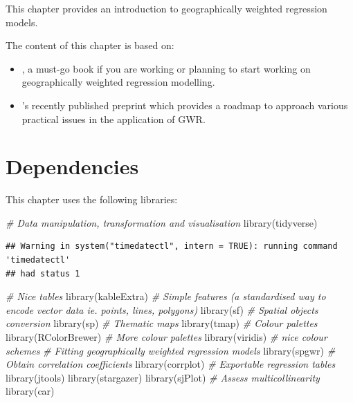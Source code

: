 \documentclass[
]{book}
\newenvironment{Shaded}{\begin{snugshade}}{\end{snugshade}}
\newcommand{\CommentTok}[1]{\textcolor[rgb]{0.56,0.35,0.01}{\textit{#1}}}
\newcommand{\FunctionTok}[1]{\textcolor[rgb]{0.00,0.00,0.00}{#1}}
\newcommand{\NormalTok}[1]{#1}
\begin{document}
This chapter provides an introduction to geographically weighted regression models.

The content of this chapter is based on:

\begin{itemize}
\item
  \citet{Fotheringham_et_al_2002_book}, a must-go book if you are working or planning to start working on geographically weighted regression modelling.
\item
  \citet{comber2020gwr}'s recently published preprint which provides a roadmap to approach various practical issues in the application of GWR.
\end{itemize}

\hypertarget{dependencies-6}{%
\section{Dependencies}\label{dependencies-6}}

This chapter uses the following libraries:

\begin{Shaded}
\begin{Highlighting}[]
\CommentTok{\# Data manipulation, transformation and visualisation}
\FunctionTok{library}\NormalTok{(tidyverse)}
\end{Highlighting}
\end{Shaded}

\begin{verbatim}
## Warning in system("timedatectl", intern = TRUE): running command 'timedatectl'
## had status 1
\end{verbatim}

\begin{Shaded}
\begin{Highlighting}[]
\CommentTok{\# Nice tables}
\FunctionTok{library}\NormalTok{(kableExtra)}
\CommentTok{\# Simple features (a standardised way to encode vector data ie. points, lines, polygons)}
\FunctionTok{library}\NormalTok{(sf) }
\CommentTok{\# Spatial objects conversion}
\FunctionTok{library}\NormalTok{(sp) }
\CommentTok{\# Thematic maps}
\FunctionTok{library}\NormalTok{(tmap) }
\CommentTok{\# Colour palettes}
\FunctionTok{library}\NormalTok{(RColorBrewer) }
\CommentTok{\# More colour palettes}
\FunctionTok{library}\NormalTok{(viridis) }\CommentTok{\# nice colour schemes}
\CommentTok{\# Fitting geographically weighted regression models}
\FunctionTok{library}\NormalTok{(spgwr)}
\CommentTok{\# Obtain correlation coefficients}
\FunctionTok{library}\NormalTok{(corrplot)}
\CommentTok{\# Exportable regression tables}
\FunctionTok{library}\NormalTok{(jtools)}
\FunctionTok{library}\NormalTok{(stargazer)}
\FunctionTok{library}\NormalTok{(sjPlot)}
\CommentTok{\# Assess multicollinearity}
\FunctionTok{library}\NormalTok{(car)}
\end{Highlighting}
\end{Shaded}
\end{document}
